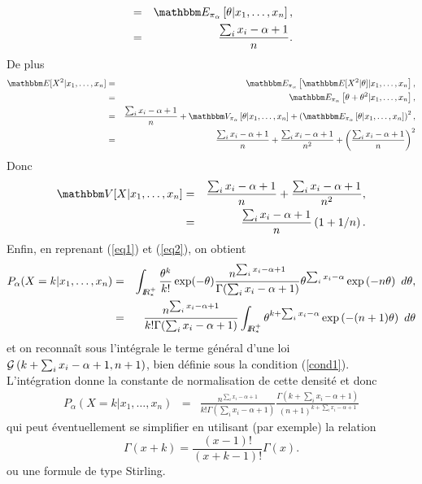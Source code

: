 \begin{enumerate}
\begin{eqnarray*}
& = &  \E_{\pi_{\alpha}}\left[\theta | x_1,\ldots,x_n\right], \\
& = & \frac{\sum_i x_i-\alpha+1}{n}.
\end{eqnarray*}
De plus 
\begin{eqnarray*}
\E[X^2|x_1,\ldots,x_n] &= & \E_{\pi_{\alpha}}\left[\E[X^2|\theta] | x_1,\ldots,x_n\right], \\
& = &  \E_{\pi_{\alpha}}\left[\theta + \theta^2| x_1,\ldots,x_n\right], \\
& = & \frac{\sum_i x_i-\alpha+1}{n} + \V_{\pi_{\alpha}}\left[\theta| x_1,\ldots,x_n\right] + \left(\E_{\pi_{\alpha}}\left[\theta| x_1,\ldots,x_n\right]\right)^2, \\
& = & \frac{\sum_i x_i-\alpha+1}{n} + \frac{\sum_i x_i-\alpha+1}{n^2} + \left(\frac{\sum_i x_i-\alpha+1}{n}\right)^2
\end{eqnarray*}
Donc
\begin{eqnarray*}
\V[X|x_1,\ldots,x_n] &= & \frac{\sum_i x_i-\alpha+1}{n} + \frac{\sum_i x_i-\alpha+1}{n^2}, \\
& = & \frac{\sum_i x_i-\alpha+1}{n}\left(1+1/n\right).
\end{eqnarray*}
Enfin, en reprenant (\ref{eq1}) et (\ref{eq2}), on obtient 
\begin{eqnarray*}
P_{\alpha}(X=k|x_1,\ldots,x_n) & = & \int_{I\!\!R^+_*} \frac{\theta^k}{k!}\exp(-\theta) \frac{n^{\sum_i x_i-\alpha+1}}{\Gamma(\sum_i x_i-\alpha+1)} \theta^{\sum_i x_i-\alpha} \exp\left(-n\theta \right) \ d\theta, \\
& = &  \frac{n^{\sum_i x_i-\alpha+1}}{k!\Gamma(\sum_i x_i-\alpha+1)}  \int_{I\!\!R^+_*} \theta^{k + \sum_i x_i-\alpha} \exp\left(-(n+1)\theta \right) \ d\theta
\end{eqnarray*}
et on reconnaît sous l'intégrale le terme général d'une loi ${\cal{G}}\left(k+\sum_i x_i-\alpha+1,n+1\right)$, bien définie sous la condition (\ref{cond1}). L'intégration donne la constante de normalisation de cette densité et donc
\begin{eqnarray*}
P_{\alpha}(X=k|x_1,\ldots,x_n) & = & \frac{n^{\sum_i x_i-\alpha+1}}{k!\Gamma(\sum_i x_i-\alpha+1)} \frac{\Gamma(k+\sum_i x_i-\alpha+1)} {(n+1)^{k+\sum_i x_i-\alpha+1}}
\end{eqnarray*}
qui peut éventuellement se simplifier en utilisant (par exemple) la relation
$$
\Gamma(x+k) = \frac{(x-1)!}{(x+k-1)!} \Gamma(x).
$$
ou une formule de type Stirling. 
\end{enumerate}




